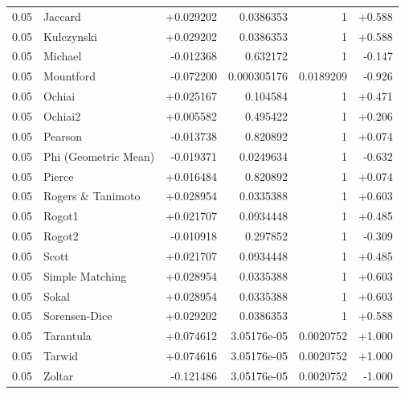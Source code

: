 \begin{longtable}{llrrrr}
0.05 & Jaccard & +0.029202 & 0.0386353 & 1 & +0.588 \\
0.05 & Kulczynski & +0.029202 & 0.0386353 & 1 & +0.588 \\
0.05 & Michael & -0.012368 & 0.632172 & 1 & -0.147 \\
0.05 & Mountford & -0.072200 & 0.000305176 & 0.0189209 & -0.926 \\
0.05 & Ochiai & +0.025167 & 0.104584 & 1 & +0.471 \\
0.05 & Ochiai2 & +0.005582 & 0.495422 & 1 & +0.206 \\
0.05 & Pearson & -0.013738 & 0.820892 & 1 & +0.074 \\
0.05 & Phi (Geometric Mean) & -0.019371 & 0.0249634 & 1 & -0.632 \\
0.05 & Pierce & +0.016484 & 0.820892 & 1 & +0.074 \\
0.05 & Rogers \& Tanimoto & +0.028954 & 0.0335388 & 1 & +0.603 \\
0.05 & Rogot1 & +0.021707 & 0.0934448 & 1 & +0.485 \\
0.05 & Rogot2 & -0.010918 & 0.297852 & 1 & -0.309 \\
0.05 & Scott & +0.021707 & 0.0934448 & 1 & +0.485 \\
0.05 & Simple Matching & +0.028954 & 0.0335388 & 1 & +0.603 \\
0.05 & Sokal & +0.028954 & 0.0335388 & 1 & +0.603 \\
0.05 & Sorensen-Dice & +0.029202 & 0.0386353 & 1 & +0.588 \\
0.05 & Tarantula & +0.074612 & 3.05176e-05 & 0.0020752 & +1.000 \\
0.05 & Tarwid & +0.074616 & 3.05176e-05 & 0.0020752 & +1.000 \\
0.05 & Zoltar & -0.121486 & 3.05176e-05 & 0.0020752 & -1.000 \\
\bottomrule
\end{longtable}

